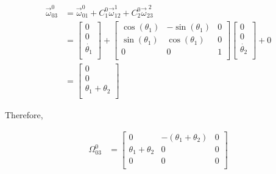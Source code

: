 \begin{parts}
\begin{subparts}
        \begin{equation*}
            \begin{split}
                \vec{\omega}^0_{03} & = \vec{\omega}^0_{01} + C_1^0\vec{\omega}^{1}_{12} + C_2^0\vec{\omega}^{\;2}_{23} \\
                & =
                \begin{bmatrix}
                    0              \\
                    0              \\
                    \dot{\theta_1} \\
                \end{bmatrix} +
                \begin{bmatrix}
                    \cos(\theta_1) & -\sin(\theta_1) & 0 \\
                    \sin(\theta_1) & \cos(\theta_1)  & 0 \\
                    0              & 0               & 1 \\
                \end{bmatrix}
                \begin{bmatrix}
                    0              \\
                    0              \\
                    \dot{\theta_2} \\
                \end{bmatrix} + 0 \\
                & =
                \begin{bmatrix}
                    0                 \\
                    0                 \\
                    \theta_1+\theta_2 \\
                \end{bmatrix}
            \end{split}
        \end{equation*}

        Therefore,

        \begin{equation*}
            \begin{split}
                {\Omega}^0_{03} & =
                \begin{bmatrix}
                    0                 & -(\theta_1+\theta_2) & 0 \\
                    \theta_1+\theta_2 & 0                    & 0 \\
                    0                 & 0                    & 0 \\
                \end{bmatrix}
            \end{split}
        \end{equation*}



    \end{subparts}

\end{parts}